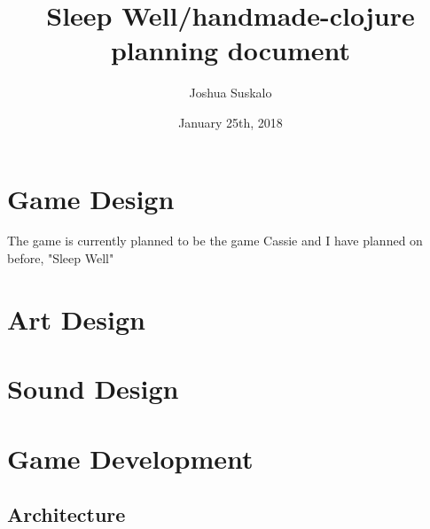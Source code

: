 \documentclass[11pt]{article}
\author{Joshua Suskalo}
\date{January 25th, 2018}
\title{Sleep Well/handmade-clojure planning document}
\begin{document}
\maketitle
\setcounter{tocdepth}{3}
\tableofcontents


\section{Game Design}
\label{sec:orgee09a9e}
The game is currently planned to be the game Cassie and I have planned on before, "Sleep Well"
\section{Art Design}
\label{sec:org13dfd4f}
\section{Sound Design}
\label{sec:org23b1086}
\section{Game Development}
\label{sec:orgc249232}
\subsection{Architecture}
\label{sec:org738ef3f}
\end{document}
